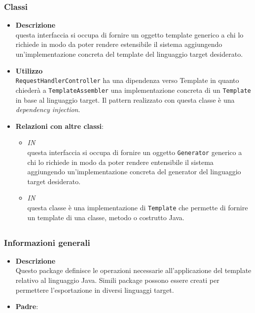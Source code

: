 \subsubsection{Classi}
\label{\nogloxy{swedesigner::server::template::Template}}
\begin{itemize}
\item \textbf{Descrizione}\\
questa interfaccia si occupa di fornire un oggetto template generico a chi lo richiede in modo da poter rendere estensibile il sistema aggiungendo un'implementazione concreta del template del linguaggio target desiderato.
\item \textbf{Utilizzo}\\
\texttt{RequestHandlerController} ha una dipendenza verso Template in quanto chiederà a \texttt{TemplateAssembler} una implementazione concreta di un \texttt{Template} in base al linguaggio target. Il pattern realizzato con questa classe è una \emph{dependency injection}.
\item \textbf{Relazioni con altre classi}:
\begin{itemize}
\item \textit{IN} \hyperref[\nogloxy{swedesigner::server::generator::Generator}]{}\\
questa interfaccia si occupa di fornire un oggetto \texttt{Generator} generico a chi lo richiede in modo da poter rendere entensibile il sistema aggiungendo un'implementazione concreta del generator del linguaggio target desiderato.
\item \textit{IN} \hyperref[\nogloxy{swedesigner::server::template::java::JavaTemplate}]{}\\
questa classe è una implementazione di \texttt{Template} che permette di fornire un template di una classe, metodo o costrutto Java.
\end{itemize}
\end{itemize}
\subsection{}
\label{\nogloxy{swedesigner::server::template::java}}
\subsubsection{Informazioni generali}
\begin{itemize}
\item \textbf{Descrizione}\\
Questo package definisce le operazioni necessarie all'applicazione del template relativo al linguaggio Java. Simili package possono essere creati per permettere l'esportazione in diversi linguaggi target.
\item \textbf{Padre}: \hyperref[\nogloxy{swedesigner::server::template}]{}
\end{itemize}
